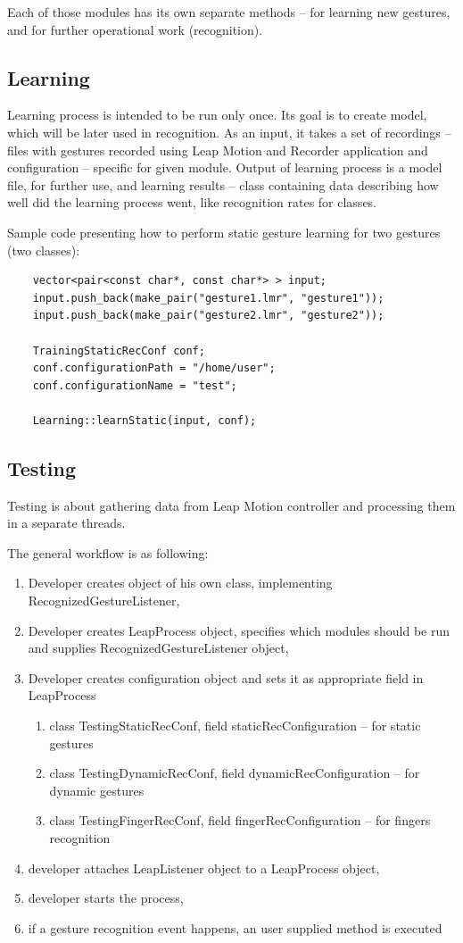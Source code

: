 Each of those modules has its own separate methods -- for learning new gestures, and for further operational work (recognition). 
	
\subsection{Learning}

Learning process is intended to be run only once. Its goal is to create model, which will be later used in recognition. As an input, it takes a set of recordings -- files with gestures recorded using Leap Motion and Recorder application and configuration -- specific for given module. Output of learning process is a model file, for further use, and learning results -- class containing data describing how well did the learning process went, like recognition rates for classes.

Sample code presenting how to perform static gesture learning for two gestures (two classes):
\begin{lstlisting}
	vector<pair<const char*, const char*> > input;
	input.push_back(make_pair("gesture1.lmr", "gesture1"));
	input.push_back(make_pair("gesture2.lmr", "gesture2"));

	TrainingStaticRecConf conf;
	conf.configurationPath = "/home/user";
	conf.configurationName = "test";

	Learning::learnStatic(input, conf);
\end{lstlisting}


\subsection{Testing}

Testing is about gathering data from Leap Motion controller and processing them in a separate threads.

The general workflow is as following:
\begin{enumerate}
  \item Developer creates object of his own class, implementing RecognizedGestureListener,
  \item Developer creates LeapProcess object, specifies which modules should be run and supplies RecognizedGestureListener object,
  \item Developer creates configuration object and sets it as appropriate field in LeapProcess
  \begin{enumerate}
  	\item class TestingStaticRecConf, field staticRecConfiguration -- for static gestures
  	\item class TestingDynamicRecConf, field dynamicRecConfiguration -- for dynamic gestures
  	\item class TestingFingerRecConf, field fingerRecConfiguration -- for fingers recognition
  \end{enumerate}
  \item developer attaches LeapListener object to a LeapProcess object,
  \item developer starts the process,
  \item if a gesture recognition event happens, an user supplied method is executed
\end{enumerate}

